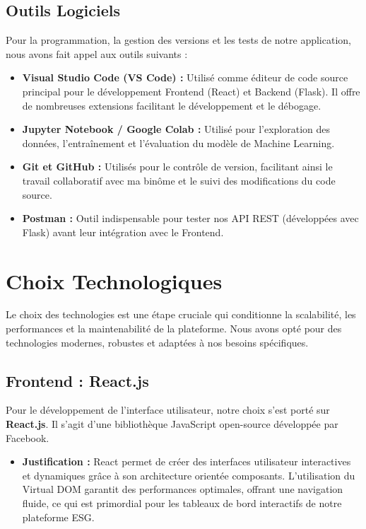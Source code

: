 \subsection{Outils Logiciels}
Pour la programmation, la gestion des versions et les tests de notre application, nous avons fait appel aux outils suivants :
\begin{itemize}
    \item \textbf{Visual Studio Code (VS Code) :} Utilisé comme éditeur de code source principal pour le développement Frontend (React) et Backend (Flask). Il offre de nombreuses extensions facilitant le développement et le débogage.
    \item \textbf{Jupyter Notebook / Google Colab :} Utilisé pour l'exploration des données, l'entraînement et l'évaluation du modèle de Machine Learning.
    \item \textbf{Git et GitHub :} Utilisés pour le contrôle de version, facilitant ainsi le travail collaboratif avec ma binôme et le suivi des modifications du code source.
    \item \textbf{Postman :} Outil indispensable pour tester nos API REST (développées avec Flask) avant leur intégration avec le Frontend.
\end{itemize}

\section{Choix Technologiques}
Le choix des technologies est une étape cruciale qui conditionne la scalabilité, les performances et la maintenabilité de la plateforme. Nous avons opté pour des technologies modernes, robustes et adaptées à nos besoins spécifiques.

\subsection{Frontend : React.js}
Pour le développement de l'interface utilisateur, notre choix s'est porté sur \textbf{React.js}. Il s'agit d'une bibliothèque JavaScript open-source développée par Facebook.
\begin{itemize}
    \item \textbf{Justification :} React permet de créer des interfaces utilisateur interactives et dynamiques grâce à son architecture orientée composants. L'utilisation du Virtual DOM garantit des performances optimales, offrant une navigation fluide, ce qui est primordial pour les tableaux de bord interactifs de notre plateforme ESG.
\end{itemize}

